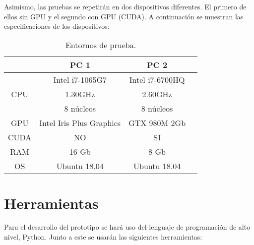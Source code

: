 Asimismo, las pruebas se repetirán en dos dispositivos diferentes. El primero de ellos sin GPU y el segundo con GPU (CUDA). A continuación se muestran las especificaciones de los dispositivos:

\begin{table}[h!]
	\begin{center}
		\begin{tabular}{ |c|c|c|c| } 
			\hline
			 & PC 1 & PC 2 \\
			\hline
			\multirow{3}{4em}{CPU} & Intel i7-1065G7 & Intel i7-6700HQ \\ 
			& 1.30GHz & 2.60GHz \\ 
			& 8 núcleos & 8 núcleos \\ 
			\hline
			GPU & Intel Iris Plus Graphics  & GTX 980M 2Gb \\
			\hline
			CUDA & NO  & SI \\
			\hline
			RAM & 16 Gb & 8 Gb \\
			\hline
			OS & Ubuntu 18.04 & Ubuntu 18.04 \\
			\hline
		\end{tabular}
		\caption{Entornos de prueba.}
		\label{tab:table1}
	\end{center}
\end{table}

\vspace{-0.8cm}

\section*{Herramientas}

Para el desarrollo del prototipo se hará uso del lenguaje de programación de alto nivel, Python. Junto a este se usarán las siguientes herramientas:

